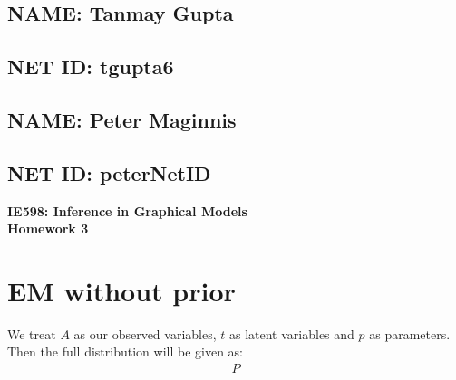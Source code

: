 \documentclass[12pt,onecolumn,letterpaper]{article}
\begin{document}
\begin{minipage}{0.5\textwidth}
\begin{flushleft}
    \subsection*{NAME: Tanmay Gupta}
\end{flushleft}
\end{minipage}
\hfill
\begin{minipage}{0.5\textwidth}
\begin{flushright}
    \subsection*{NET ID: tgupta6}
\end{flushright}
\end{minipage}

\begin{minipage}{0.5\textwidth}
\begin{flushleft}
    \subsection*{NAME: Peter Maginnis}
\end{flushleft}
\end{minipage}
\hfill
\begin{minipage}{0.5\textwidth}
\begin{flushright}
    \subsection*{NET ID: peterNetID}
\end{flushright}
\end{minipage}\begin{center}
    \Large\textbf{IE598: Inference in Graphical Models}\\
    \textbf{Homework 3}
\end{center}

\section*{EM without prior}
We treat $A$ as our observed variables, $t$ as latent variables and $p$ as parameters. Then the full distribution will be given as:
\begin{align*}
P
\end{align*}
\end{document}
